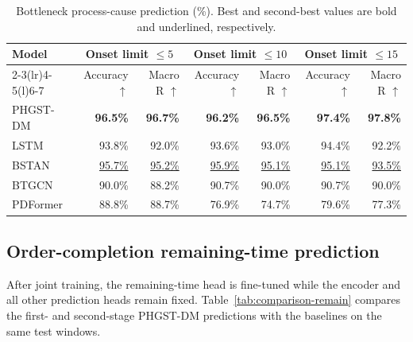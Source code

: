 \begin{table}[!htbp]
\centering
\caption{Bottleneck process-cause prediction (\%). Best and second-best values are bold and underlined, respectively.}
\label{tab:comparison-state}
\footnotesize
\setlength{\tabcolsep}{3.2pt}
\renewcommand{\arraystretch}{1.12}
\begin{fittable}
\begin{tabular*}{\linewidth}{@{\extracolsep{\fill}}lrrrrrr@{}}
\toprule
Model & \multicolumn{2}{c}{Onset limit $\leq5$} & \multicolumn{2}{c}{Onset limit $\leq10$} & \multicolumn{2}{c}{Onset limit $\leq15$} \\
\cmidrule(lr){2-3}\cmidrule(lr){4-5}\cmidrule(l){6-7}
 & Accuracy $\uparrow$ & Macro R $\uparrow$ & Accuracy $\uparrow$ & Macro R $\uparrow$ & Accuracy $\uparrow$ & Macro R $\uparrow$ \\
\midrule
PHGST-DM & \textbf{96.5\%} & \textbf{96.7\%} & \textbf{96.2\%} & \textbf{96.5\%} & \textbf{97.4\%} & \textbf{97.8\%} \\
LSTM & 93.8\% & 92.0\% & 93.6\% & 93.0\% & 94.4\% & 92.2\% \\
BSTAN & \underline{95.7\%} & \underline{95.2\%} & \underline{95.9\%} & \underline{95.1\%} & \underline{95.1\%} & \underline{93.5\%} \\
BTGCN & 90.0\% & 88.2\% & 90.7\% & 90.0\% & 90.7\% & 90.0\% \\
PDFormer & 88.8\% & 88.7\% & 76.9\% & 74.7\% & 79.6\% & 77.3\% \\
\bottomrule
\end{tabular*}
\end{fittable}
\end{table}

\subsection{Order-completion remaining-time prediction}\label{sec:comparison-remain}

After joint training, the remaining-time head is fine-tuned while the encoder and all other prediction heads remain fixed. Table~\ref{tab:comparison-remain} compares the first- and second-stage PHGST-DM predictions with the baselines on the same test windows.

